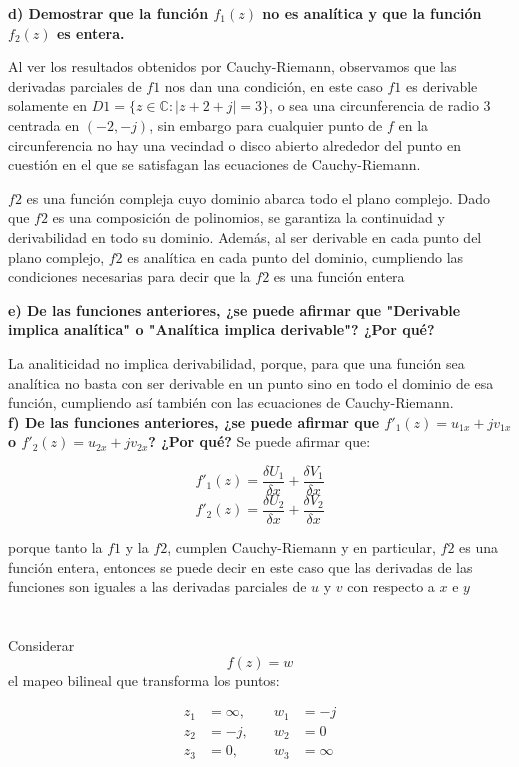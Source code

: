 \documentclass[12pt]{report}
\begin{document}
\textbf{d) Demostrar que la función $f_1(z)$ no es analítica y que la función $f_2(z)$ es entera.}

Al ver los resultados obtenidos por Cauchy-Riemann, observamos que las derivadas parciales de $f1$ nos dan una condición, en este caso $f1$ es derivable solamente
en $D1 = \{z \in \mathbb{C} : |z + 2 + j| = 3\}$, o sea una circunferencia de radio $3$ centrada en $(-2, -j)$, sin embargo para cualquier punto de $f$ en la
circunferencia no hay una vecindad o disco abierto alrededor del punto en cuestión en el que se satisfagan las ecuaciones de Cauchy-Riemann.

$f2$ es una función compleja cuyo dominio abarca todo el plano complejo. Dado que $f2$ es una composición de polinomios, se garantiza la continuidad y
derivabilidad en todo su dominio. Además, al ser derivable en cada punto del plano complejo, $f2$ es analítica en cada punto del dominio, cumpliendo las
condiciones necesarias para decir que la $f2$ es una función entera

\textbf{e) De las funciones anteriores, ¿se puede afirmar que "Derivable implica analítica" o "Analítica implica derivable"? ¿Por qué?}

La analiticidad no implica derivabilidad, porque, para que una función sea analítica no basta con ser derivable en un punto sino en todo el dominio de esa
función, cumpliendo así también con las ecuaciones de Cauchy-Riemann.\\

\textbf{f) De las funciones anteriores, ¿se puede afirmar que $f'_1(z) = u_{1x} + jv_{1x}$ o $f'_2(z) = u_{2x} + jv_{2x}$? ¿Por qué?}
Se puede afirmar que:

$$f'_1(z)=\frac{\delta U_1}{\delta x}+\frac{\delta V_1}{\delta x}$$
$$f'_2(z)=\frac{\delta U_2}{\delta x}+\frac{\delta V_2}{\delta x}$$

porque tanto la $f1$ y la $f2$, cumplen Cauchy-Riemann y en particular, $f2$ es una función entera, entonces se puede decir en este caso que las derivadas de las
funciones son iguales a las derivadas parciales de $u$ y $v$ con respecto a $x$ e $y$

\chapter{}%

Considerar $$ f(z) = w $$ el mapeo bilineal que transforma los puntos:

\begin{align*}
    z_1 &= \infty, \quad & w_1 &= -j \\
    z_2 &= -j, \quad & w_2 &= 0 \\
    z_3 &= 0, \quad & w_3 &= \infty 
\end{align*}
\end{document}
